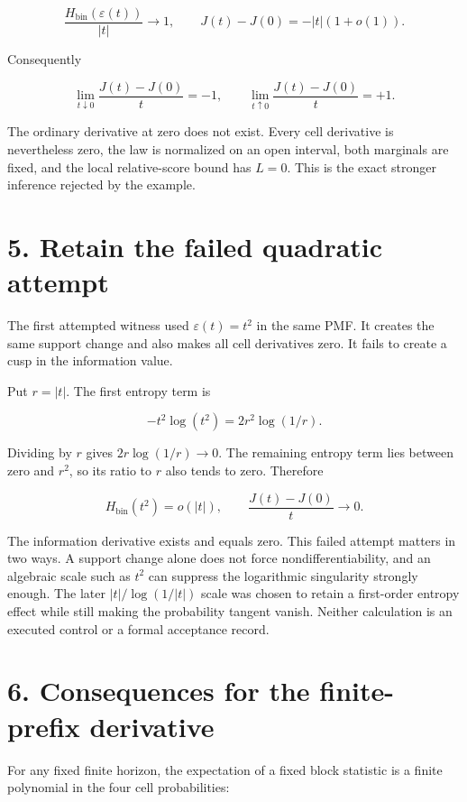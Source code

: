 \documentclass[11pt,a4paper]{article}
\begin{document}
\[
\frac{H_{\mathrm{bin}}(\varepsilon(t))}{|t|}\longrightarrow1,
\qquad
J(t)-J(0)=-|t|(1+o(1)). \tag{4}
\]

Consequently

\[
\lim_{t\downarrow0}\frac{J(t)-J(0)}t=-1,\qquad
\lim_{t\uparrow0}\frac{J(t)-J(0)}t=+1. \tag{5}
\]

The ordinary derivative at zero does not exist. Every cell derivative is nevertheless zero, the law is normalized on an open interval, both marginals are fixed, and the local relative-score bound has \(L=0\). This is the exact stronger inference rejected by the example.

\section{5. Retain the failed quadratic attempt}\label{retain-the-failed-quadratic-attempt}

The first attempted witness used \(\varepsilon(t)=t^2\) in the same PMF. It creates the same support change and also makes all cell derivatives zero. It fails to create a cusp in the information value.

Put \(r=|t|\). The first entropy term is

\[
-t^2\log(t^2)=2r^2\log(1/r).
\]

Dividing by \(r\) gives \(2r\log(1/r)\to0\). The remaining entropy term lies between zero and \(r^2\), so its ratio to \(r\) also tends to zero. Therefore

\[
H_{\mathrm{bin}}(t^2)=o(|t|),\qquad
\frac{J(t)-J(0)}t\longrightarrow0.
\]

The information derivative exists and equals zero. This failed attempt matters in two ways. A support change alone does not force nondifferentiability, and an algebraic scale such as \(t^2\) can suppress the logarithmic singularity strongly enough. The later \(|t|/\log(1/|t|)\) scale was chosen to retain a first-order entropy effect while still making the probability tangent vanish. Neither calculation is an executed control or a formal acceptance record.

\section{6. Consequences for the finite-prefix derivative}\label{consequences-for-the-finite-prefix-derivative}

For any fixed finite horizon, the expectation of a fixed block statistic is a finite polynomial in the four cell probabilities:
\end{document}
